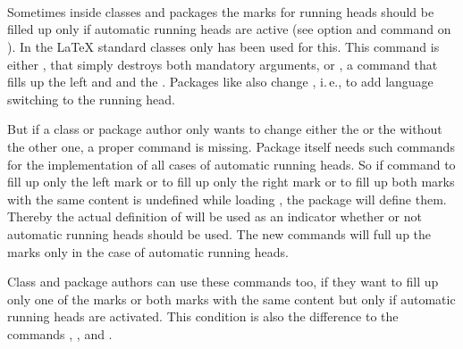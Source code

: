 %
%

\begin{Declaration}
  \\
  \\
  \\
\end{Declaration}
%
%
%
%
Sometimes inside classes and packages the marks for running heads should be
filled up only if automatic running heads are active (see option
 and command  on
). In the \LaTeX{} standard
classes only  has been used for this. This command is either
, that simply destroys both mandatory arguments, or
, a command that fills up the left and  and
the . Packages like  also change
\Macro{\@mkboth}, i.\,e., to add language switching to the running head.

But if a class or package author only wants to change either the  or the  without the other one, a proper command is
missing. Package  itself needs such commands for the
implementation of all cases of automatic running heads. So if command
 to fill up only the left mark or  to fill up
only the right mark or  to fill up both marks with the same
content is undefined while loading , the package will define
them. Thereby the actual definition of  will be used as an
indicator whether or not automatic running heads should be used. The new
commands will full up the marks only in the case of automatic running heads.

Class and package authors can use these commands too, if they want to fill up
only one of the marks or both marks with the same content but only if
automatic running heads are activated. This condition is also the difference
to the commands , , and .%
%
%
%
%


\fi %


\ifshortversion%
%
\fi

